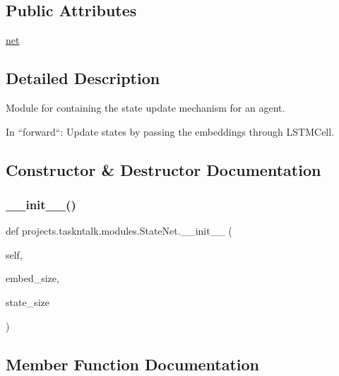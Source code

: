 \subsection*{Public Attributes}
\begin{DoxyCompactItemize}
\item 
\hyperlink{classprojects_1_1taskntalk_1_1modules_1_1StateNet_a4499c3c6f15bc68c514202ed019f4eff}{net}
\end{DoxyCompactItemize}


\subsection{Detailed Description}
\begin{DoxyVerb}Module for containing the state update mechanism for an agent.

In
``forward``: Update states by passing the embeddings through LSTMCell.
\end{DoxyVerb}
 

\subsection{Constructor \& Destructor Documentation}
\mbox{\label{classprojects_1_1taskntalk_1_1modules_1_1StateNet_a46a465e3b5b7b29d39d29e76829bf229}} 
\subsubsection{\texorpdfstring{\+\_\+\+\_\+init\+\_\+\+\_\+()}{\_\_init\_\_()}}
{\footnotesize\ttfamily def projects.\+taskntalk.\+modules.\+State\+Net.\+\_\+\+\_\+init\+\_\+\+\_\+ (\begin{DoxyParamCaption}\item[{}]{self,  }\item[{}]{embed\+\_\+size,  }\item[{}]{state\+\_\+size }\end{DoxyParamCaption})}



\subsection{Member Function Documentation}
\mbox{\label{classprojects_1_1taskntalk_1_1modules_1_1StateNet_a3305ceee97d7761dd2417ad776cf046f}} 
